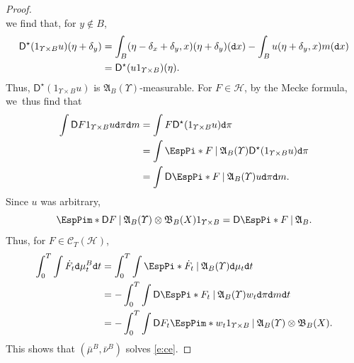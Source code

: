 \documentclass[JEP,XML,SOM,Unicode,published]{cedram}
\theoremstyle{definition}
\theoremstyle{remark}
\DeclarePairedDelimiter{\paren}{\lparen}{\rparen}
\newcommand{\given}[1][]{%
\nonscript\:#1\vert
\allowbreak
\nonscript\:
\mathopen{}}
\begin{document}
\begin{proof}
\begin{equation*}
\end{equation*}
we find that, for $y \not\in B$,
\begin{align*}
\mathsf{D}^{\star}( 1_{\varUpsilon \times B} u)(\eta +\delta_{y}) &= \int_{B}(\eta - \delta_{x} + \delta_{y}, x) (\eta + \delta_{y})(\mathtt{d} x) - \int_{B} u(\eta+\delta_{y}, x) m(\mathtt{d} x)\\
&= \mathsf{D}^{\star} \paren*{ u 1_{\varUpsilon \times B} }(\eta).
\end{align*}
Thus, $\mathsf{D}^{\star}(1_{\varUpsilon \times B} u)$ is $\mathfrak{A}_{B}(\varUpsilon)$-measurable.
For $F \in \mathscr{H}$, by the Mecke formula, we~thus find that
\begin{align*}
\int \mathsf{D} F 1_{\varUpsilon \times B} u \mathtt{d} \pi \mathtt{d} m &= \int F \mathsf{D}^{\star} \paren*{ 1_{\varUpsilon \times B} u } \mathtt{d} \pi \\
&= \int \EspPi*{ F \given \mathfrak{A}_{B}(\varUpsilon) } \mathsf{D}^{\star} \paren*{ 1_{\varUpsilon \times B} u } \mathtt{d} \pi \\
&= \int \mathsf{D} \EspPi*{ F \given \mathfrak{A}_{B}(\varUpsilon) } u \mathtt{d} \pi \mathtt{d} m.
\end{align*}
Since $u$ was arbitrary,
\begin{equation*}
\EspPim*{ \mathsf{D} F \given \mathfrak{A}_{B}(\varUpsilon) \otimes \mathfrak{B}_{B}(X) } 1_{\varUpsilon \times B} = \mathsf{D} \EspPi*{ F \given \mathfrak{A}_{B} }.
\end{equation*}
Thus, for $F \in \mathscr{C}_{T}(\mathscr{H})$,
\begin{align*}
\int_{0}^{T} \int \dot{F}_{t} \mathtt{d} \mu^{B}_{t} \mathtt{d} t &= \int_{0}^{T} \int \EspPi*{ \dot{F}_{t} \given \mathfrak{A}_{B}(\varUpsilon) } \mathtt{d} \mu_{t} \mathtt{d} t \\
&= - \int_{0}^{T} \int \mathsf{D} \EspPi*{ F_{t} \given \mathfrak{A}_{B}(\varUpsilon) } w_{t} \mathtt{d} \pi \mathtt{d} m \mathtt{d} t \\
&= - \int_{0}^{T} \int \mathsf{D} F_{t} \EspPim*{ w_{t} 1_{\varUpsilon \times B} \given \mathfrak{A}_{B}(\varUpsilon) \otimes \mathfrak{B}_{B}(X) }.
\end{align*}
This shows that $(\bar{\mu}^{B}, \bar{\nu}^{B})$ solves \cref{e:ce}.


\end{proof}
\end{document}
